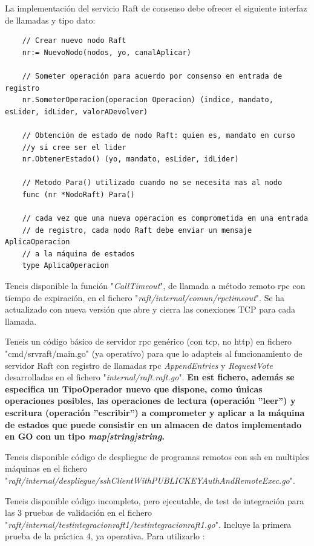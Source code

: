 \documentclass{unizarpractice}
\begin{document}
La implementación del servicio Raft de consenso debe ofrecer el siguiente interfaz de llamadas y tipo dato:

\begin{verbatim}
	// Crear nuevo nodo Raft
	nr:= NuevoNodo(nodos, yo, canalAplicar)
	
	// Someter operación para acuerdo por consenso en entrada de registro
	nr.SometerOperacion(operacion Operacion) (indice, mandato, esLider, idLider, valorADevolver)
	
	// Obtención de estado de nodo Raft: quien es, mandato en curso
	//y si cree ser el lider
	nr.ObtenerEstado() (yo, mandato, esLider, idLider)
	
	// Metodo Para() utilizado cuando no se necesita mas al nodo
	func (nr *NodoRaft) Para()
	
	// cada vez que una nueva operacion es comprometida en una entrada
	// de registro, cada nodo Raft debe enviar un mensaje AplicaOperacion
	// a la máquina de estados
	type AplicaOperacion	
\end{verbatim}

Teneis disponible la función "\textit{CallTimeout}", de llamada a método remoto rpc con tiempo de expiración, en el fichero "\textit{raft/internal/comun/rpctimeout}". Se ha actualizado con nueva versión que abre y cierra las conexiones TCP para cada llamada.

Teneis un código básico de servidor rpc genérico (con tcp, no http) en fichero "cmd/srvraft/main.go" (ya operativo) para que lo adapteis al funcionamiento de servidor Raft con registro de llamadas rpc \textit{AppendEntries} y \textit{RequestVote} desarrolladas en el fichero "\textit{internal/raft.raft.go}". \textbf{En est fichero, además se especifica un TipoOperador nuevo que dispone, como únicas operaciones posibles, las operaciones de lectura (operación ''leer'') y escritura (operación ''escribir'') a comprometer y aplicar a la máquina de estados que puede consistir en un almacen de datos implementado en GO con un tipo \textit{map[string]string}.}

Teneis disponible código de despliegue de programas remotos con ssh en multiples máquinas en el fichero "\textit{raft/internal/despliegue/sshClientWithPUBLICKEYAuthAndRemoteExec.go}".

Teneis disponible código incompleto, pero ejecutable, de test de integración para las 3 pruebas de validación en el fichero "\textit{raft/internal/testintegracionraft1/testintegracionraft1.go}". Incluye la primera prueba de la práctica 4, ya operativa. Para utilizarlo :
\end{document}

